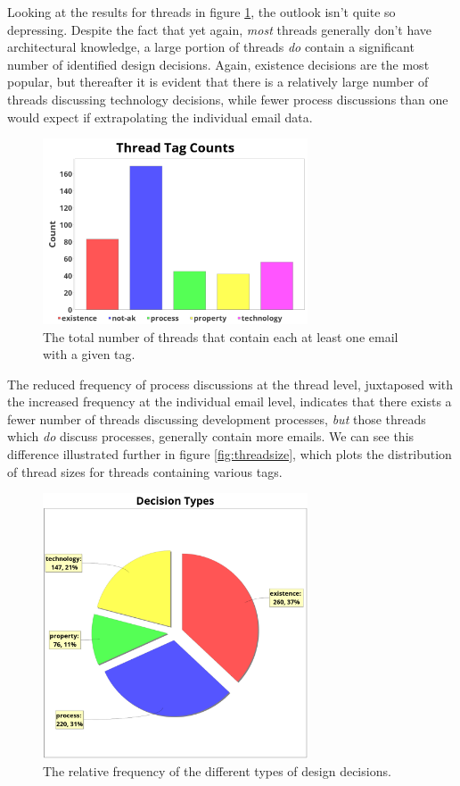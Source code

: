 \documentclass[a4paper, 12pt]{article}
\begin{document}
		Looking at the results for threads in figure \ref{fig:threadtagcount}, the outlook isn't quite so depressing. Despite the fact that yet again, \textit{most} threads generally don't have architectural knowledge, a large portion of threads \textit{do} contain a significant number of identified design decisions. Again, existence decisions are the most popular, but thereafter it is evident that there is a relatively large number of threads discussing technology decisions, while fewer process discussions than one would expect if extrapolating the individual email data.
	
		\begin{figure}[H]
			\centering
			\includegraphics[width=0.7\textwidth]{report/thread_tag_counts.png}
			\caption{The total number of threads that contain each at least one email with a given tag.}
			\label{fig:threadtagcount}
		\end{figure}
	
		The reduced frequency of process discussions at the thread level, juxtaposed with the increased frequency at the individual email level, indicates that there exists a fewer number of threads discussing development processes, \textit{but} those threads which \textit{do} discuss processes, generally contain more emails. We can see this difference illustrated further in figure \ref{fig:threadsize}, which plots the distribution of thread sizes for threads containing various tags.
		
		\begin{figure}
			\centering
			\includegraphics[width=0.7\textwidth]{report/decision_types_pie.png}
			\caption{The relative frequency of the different types of design decisions.}
			\label{fig:decision-types-pie}
		\end{figure}
		
\end{document}
